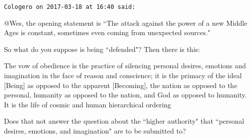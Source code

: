 \begin{footnotesize}
\begin{sffamily}
\texttt{Cologero on 2017-03-18 at 16:40 said: }

@Wes, the opening statement is ``The attack against the power of a new Middle Ages is constant, sometimes even coming from unexpected sources."

So what do you suppose is being ``defended"? Then there is this:

\begin{quotex}
The vow of obedience is the practice of silencing personal desires, emotions and imagination in the face of reason and conscience; it is the primacy of the ideal [Being] as opposed to the apparent [Becoming], the nation as opposed to the personal, humanity as opposed to the nation, and God as opposed to humanity. It is the life of cosmic and human hierarchical ordering

\end{quotex}
Does that not answer the question about the ``higher authority" that ``personal desires, emotions, and imagination" are to be submitted to?


\end{sffamily}\end{footnotesize}
